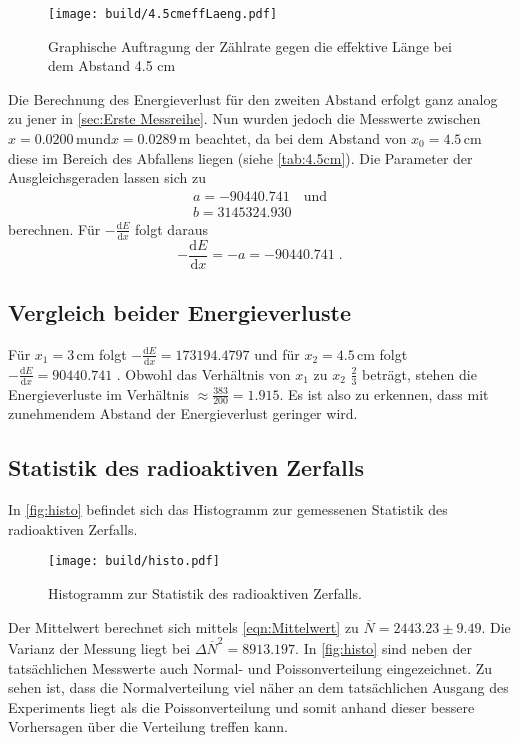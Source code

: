 \begin{figure}
  \centering
  \texttt{[image: build/4.5cmeffLaeng.pdf]}
  \caption{Graphische Auftragung der Zählrate gegen die effektive Länge bei dem Abstand 4.5 $\unit{\cm}$}
  \label{fig:4.5graph}
\end{figure}
Die Berechnung des Energieverlust für den zweiten Abstand erfolgt ganz analog zu jener in \autoref{sec:Erste Messreihe}.
Nun wurden jedoch die Messwerte zwischen $x=0.0200\, \unit{\meter} \text{und} x= 0.0289 \, \unit{\meter}$ beachtet, da bei dem Abstand
von $x_0=4.5 \, \unit{\cm}$ diese im Bereich des Abfallens liegen (siehe \autoref{tab:4.5cm}).
Die Parameter der Ausgleichsgeraden lassen sich zu
\begin{align*}
  a= -90440.741 \quad \text{und}\\
  b = 3145324.930
\end{align*}
berechnen.
Für $-\frac{\text{d}E}{\text{d}x}$ folgt daraus
\begin{equation*}
  -\frac{\text{d}E}{\text{d}x}=-a = -90440.741 \; .
\end{equation*}

\newpage
\subsection{Vergleich beider Energieverluste}
Für $x_1= 3\,\unit{\cm} $ folgt $-\frac{\text{d}E}{\text{d}x}=173194.4797$ und für $x_2= 4.5\,\unit{\cm}$ folgt $-\frac{\text{d}E}{\text{d}x}=90440.741$ .
Obwohl das Verhältnis von $x_1$ zu $x_2$ $\frac{2}{3}$ beträgt, stehen die Energieverluste im Verhältnis $\approx \frac{383}{200}=1.915$.
Es ist also zu erkennen, dass mit zunehmendem Abstand der Energieverlust geringer wird.

\subsection{Statistik des radioaktiven Zerfalls}
In \autoref{fig:histo} befindet sich das Histogramm zur gemessenen Statistik des radioaktiven Zerfalls.

\begin{figure}
  \centering
  \texttt{[image: build/histo.pdf]}
  \caption{Histogramm zur Statistik des radioaktiven Zerfalls.}
  \label{fig:histo}
\end{figure}

Der Mittelwert berechnet sich mittels \autoref{eqn:Mittelwert} zu $\overline{N} = 2443.23 \pm 9.49$. Die Varianz
der Messung liegt bei ${\Delta\overline{N}}^2 = 8913.197$.
In \autoref{fig:histo} sind neben der tatsächlichen Messwerte auch Normal- und Poissonverteilung eingezeichnet.
Zu sehen ist, dass die Normalverteilung viel näher an dem tatsächlichen Ausgang des Experiments liegt als die Poissonverteilung und somit 
anhand dieser bessere Vorhersagen über die Verteilung treffen kann.